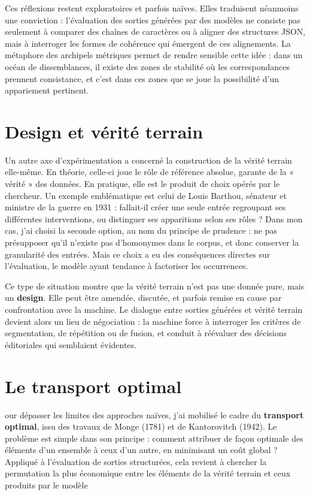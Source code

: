 Ces réflexions restent exploratoires et parfois naïves. Elles traduisent néanmoins une conviction : l’évaluation des sorties générées par des modèles ne consiste pas seulement à comparer des chaînes de caractères ou à aligner des structures JSON, mais à interroger les formes de cohérence qui émergent de ces alignements. La métaphore des archipels métriques permet de rendre sensible cette idée : dans un océan de dissemblances, il existe des zones de stabilité où les correspondances prennent consistance, et c’est dans ces zones que se joue la possibilité d’un appariement pertinent.

\section{Design et vérité terrain}

Un autre axe d’expérimentation a concerné la construction de la vérité terrain elle-même. En théorie, celle-ci joue le rôle de référence absolue, garante de la « vérité » des données. En pratique, elle est le produit de choix opérés par le chercheur. Un exemple emblématique est celui de Louis Barthou, sénateur et ministre de la guerre en 1931 : fallait-il créer une seule entrée regroupant ses différentes interventions, ou distinguer ses apparitions selon ses rôles ? Dans mon cas, j’ai choisi la seconde option, au nom du principe de prudence : ne pas présupposer qu’il n’existe pas d’homonymes dans le corpus, et donc conserver la granularité des entrées. Mais ce choix a eu des conséquences directes sur l’évaluation, le modèle ayant tendance à factoriser les occurrences.

Ce type de situation montre que la vérité terrain n’est pas une donnée pure, mais un \textbf{design}. Elle peut être amendée, discutée, et parfois remise en cause par confrontation avec la machine. Le dialogue entre sorties générées et vérité terrain devient alors un lieu de négociation : la machine force à interroger les critères de segmentation, de répétition ou de fusion, et conduit à réévaluer des décisions éditoriales qui semblaient évidentes.

\section{Le transport optimal}

our dépasser les limites des approches naïves, j’ai mobilisé le cadre du \textbf{transport optimal}, issu des travaux de Monge (1781) et de Kantorovitch (1942). Le problème est simple dans son principe : comment attribuer de façon optimale des éléments d’un ensemble à ceux d’un autre, en minimisant un coût global ? Appliqué à l’évaluation de sorties structurées, cela revient à chercher la permutation la plus économique entre les éléments de la vérité terrain et ceux produits par le modèle


